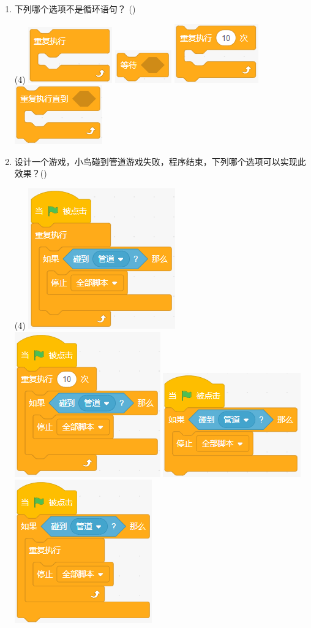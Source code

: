 \documentclass[10pt, a4paper]{article}
\newcommand{\hq}{\hfill(\qquad)}
\begin{document}
\begin{enumerate}
        \item 下列哪个选项不是循环语句？ \hq
        \begin{tasks}(4)
            \task \includegraphics[width=.12\textwidth]{figure/5a.png}
            \task \includegraphics[width=.12\textwidth]{figure/5b.png}
            \task \includegraphics[width=.12\textwidth]{figure/5c.png}
            \task \includegraphics[width=.12\textwidth]{figure/5d.png}
        \end{tasks}

        \item 设计一个游戏，小鸟碰到管道游戏失败，程序结束，下列哪个选项可以实现此效果？\hq
        \begin{tasks}(4)
            \task \includegraphics[width=.15\textwidth]{figure/6a.png}
            \task \includegraphics[width=.145\textwidth]{figure/6b.png}
            \task \includegraphics[width=.18\textwidth]{figure/6c.png}
            \task \includegraphics[width=.14\textwidth]{figure/6d.png}
        \end{tasks}


\end{enumerate}
\end{document}
